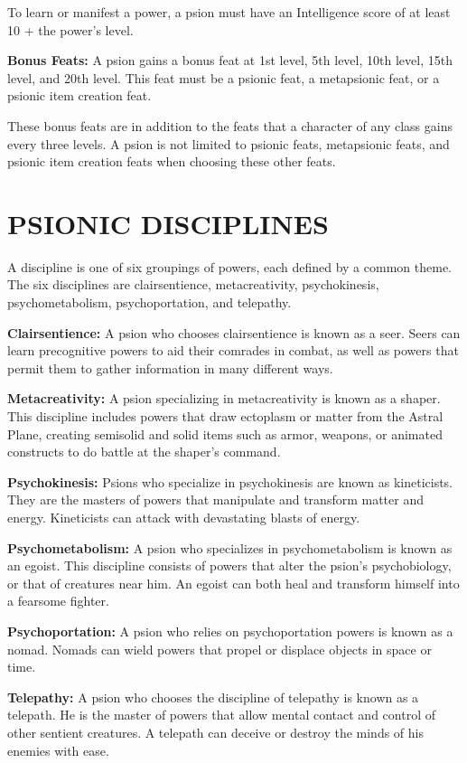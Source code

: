 \documentclass{article}
\begin{document}
To learn or manifest a power, a psion must have an Intelligence score of at least 
10 + the power's level.

\textbf{Bonus Feats:} A psion gains a bonus feat at 1st level, 5th level, 10th 
level, 15th level, and 20th level. This feat must be a psionic feat, a metapsionic 
feat, or a psionic item creation feat.

These bonus feats are in addition to the feats that a character of any class gains 
every three levels. A psion is not limited to psionic feats, metapsionic feats, 
and psionic item creation feats when choosing these other feats.

\vspace{12pt}
\section*{PSIONIC DISCIPLINES}

A discipline is one of six groupings of powers, each defined by a common theme. 
The six disciplines are clairsentience, metacreativity, psychokinesis, psychometabolism, 
psychoportation, and telepathy.

\textbf{Clairsentience:} A psion who chooses clairsentience is known as a seer. 
Seers can learn precognitive powers to aid their comrades in combat, as well as 
powers that permit them to gather information in many different ways.

\textbf{Metacreativity:} A psion specializing in metacreativity is known as a shaper. 
This discipline includes powers that draw ectoplasm or matter from the Astral Plane, 
creating semisolid and solid items such as armor, weapons, or animated constructs 
to do battle at the shaper's command.

\textbf{Psychokinesis:} Psions who specialize in psychokinesis are known as kineticists. 
They are the masters of powers that manipulate and transform matter and energy. 
Kineticists can attack with devastating blasts of energy.

\textbf{Psychometabolism: }A psion who specializes in psychometabolism is known 
as an egoist. This discipline consists of powers that alter the psion's psychobiology, 
or that of creatures near him. An egoist can both heal and transform himself into 
a fearsome fighter.

\textbf{Psychoportation: }A psion who relies on psychoportation powers is known 
as a nomad. Nomads can wield powers that propel or displace objects in space or 
time.

\textbf{Telepathy:} A psion who chooses the discipline of telepathy is known as 
a telepath. He is the master of powers that allow mental contact and control of 
other sentient creatures. A telepath can deceive or destroy the minds of his enemies 
with ease.
\end{document}
